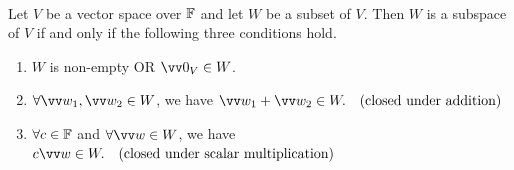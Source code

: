 \begin{theorem}
    \phantom{}  \\
    Let $V$ be a vector space over ${\mathbb{F}}$ and let $W$ be a subset of $V$. Then $W$ is a subspace of $V$ if and
    only if the following three conditions hold.
    \begin{enumerate}[label=(\alph*)]
        \item $W$ is non-empty  \quad OR \quad $\vzero_V \in W$.
        \item $\forall \vw_1, \vw_2 \in W$, we have $\vw_1 + \vw_2 \in W. \quad \text{(closed under addition)}$
        \item $\forall c \in {\mathbb{F}}$ and $\forall \vw \in W$, we have $c \vw \in W. \quad \text{(closed under scalar multiplication)}$
    \end{enumerate}    
\end{theorem}

